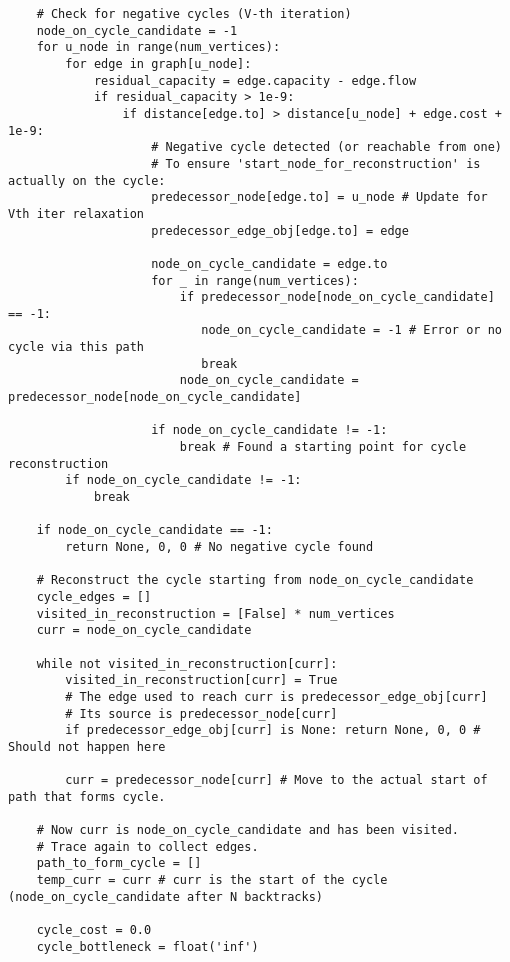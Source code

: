 \begin{verbatim}
    # Check for negative cycles (V-th iteration)
    node_on_cycle_candidate = -1
    for u_node in range(num_vertices):
        for edge in graph[u_node]:
            residual_capacity = edge.capacity - edge.flow
            if residual_capacity > 1e-9:
                if distance[edge.to] > distance[u_node] + edge.cost + 1e-9:
                    # Negative cycle detected (or reachable from one)
                    # To ensure 'start_node_for_reconstruction' is actually on the cycle:
                    predecessor_node[edge.to] = u_node # Update for Vth iter relaxation
                    predecessor_edge_obj[edge.to] = edge
                    
                    node_on_cycle_candidate = edge.to 
                    for _ in range(num_vertices):
                        if predecessor_node[node_on_cycle_candidate] == -1: 
                           node_on_cycle_candidate = -1 # Error or no cycle via this path
                           break 
                        node_on_cycle_candidate = predecessor_node[node_on_cycle_candidate]
                    
                    if node_on_cycle_candidate != -1:
                        break # Found a starting point for cycle reconstruction
        if node_on_cycle_candidate != -1:
            break
            
    if node_on_cycle_candidate == -1:
        return None, 0, 0 # No negative cycle found

    # Reconstruct the cycle starting from node_on_cycle_candidate
    cycle_edges = []
    visited_in_reconstruction = [False] * num_vertices
    curr = node_on_cycle_candidate
    
    while not visited_in_reconstruction[curr]:
        visited_in_reconstruction[curr] = True
        # The edge used to reach curr is predecessor_edge_obj[curr]
        # Its source is predecessor_node[curr]
        if predecessor_edge_obj[curr] is None: return None, 0, 0 # Should not happen here
        
        curr = predecessor_node[curr] # Move to the actual start of path that forms cycle.
        
    # Now curr is node_on_cycle_candidate and has been visited.
    # Trace again to collect edges.
    path_to_form_cycle = []
    temp_curr = curr # curr is the start of the cycle (node_on_cycle_candidate after N backtracks)
    
    cycle_cost = 0.0
    cycle_bottleneck = float('inf')


\end{verbatim}
